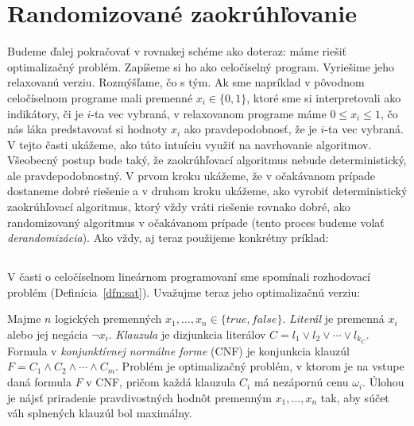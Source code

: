 \section{Randomizované zaokrúhľovanie}

Budeme ďalej pokračovať v rovnakej schéme ako doteraz:
máme riešiť optimalizačný problém. Zapíšeme si ho ako celočíselný program. Vyriešime
jeho relaxovanú verziu. Rozmýšľame, čo s tým. 
Ak sme  napríklad v pôvodnom celočíselnom programe mali premenné $x_i\in\{0,1\}$, 
ktoré sme si interpretovali ako indikátory, či je $i$-ta vec vybraná, v relaxovanom 
programe máme $0\le x_i\le1$, čo nás láka predstavovať si hodnoty $x_i$ ako pravdepodobnosť,
že je $i$-ta vec vybraná. V tejto časti ukážeme, ako túto intuíciu využiť na navrhovanie algoritmov.
Všeobecný postup bude taký, že zaokrúhľovací algoritmus nebude deterministický, ale pravdepodobnostný.
V prvom kroku ukážeme, že v očakávanom prípade dostaneme dobré riešenie a v druhom kroku ukážeme,
ako vyrobiť deterministický zaokrúhľovací algoritmus, ktorý vždy vráti riešenie rovnako dobré, ako
randomizovaný algoritmus v očakávanom prípade (tento proces budeme volať {\em derandomizácia}).
Ako vždy, aj teraz použijeme konkrétny príklad:

\subsection*{\maxsat}

\noindent
V časti o celočíselnom lineárnom programovaní sme spomínali rozhodovací 
problém \sat (Definícia~\ref{dfn:sat}).
Uvažujme teraz jeho optimalizačnú verziu:

\begin{framed}
\begin{dfn}
  \label{dfn:maxsat}
  Majme $n$ logických premenných $x_1,\ldots,x_n\in\{true,false\}$. {\em
  Literál} je premenná $x_i$ alebo jej negácia $\neg{x_i}$. {\em Klauzula} je
  dizjunkcia literálov $C=l_1\vee l_2\vee\cdots\vee l_{k_C}$.  Formula v {\em
  konjunktívnej normálne forme} (CNF) je konjunkcia klauzúl $F=C_1\wedge
  C_2\wedge\cdots\wedge C_m$. Problém \maxsat je optimalizačný problém, v ktorom
  je na vstupe daná formula $F$  v CNF, pričom každá klauzula $C_i$ má  
  nezápornú cenu $\omega_i$. Úlohou je 
  nájsť priradenie pravdivostných hodnôt premenným $x_1,\ldots,x_n$ tak, aby 
  súčet váh splnených klauzúl bol maximálny.
\end{dfn}
\end{framed}


